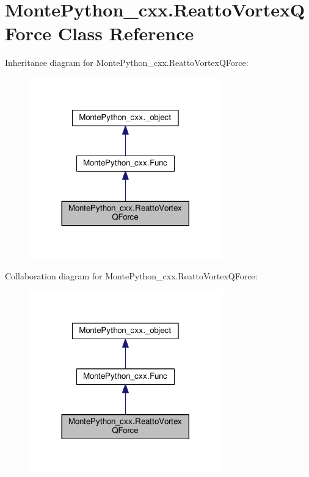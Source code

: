 \hypertarget{classMontePython__cxx_1_1ReattoVortexQForce}{}\section{Monte\+Python\+\_\+cxx.\+Reatto\+Vortex\+Q\+Force Class Reference}
\label{classMontePython__cxx_1_1ReattoVortexQForce}


Inheritance diagram for Monte\+Python\+\_\+cxx.\+Reatto\+Vortex\+Q\+Force\+:
\nopagebreak
\begin{figure}[H]
\begin{center}
\leavevmode
\includegraphics[width=236pt]{classMontePython__cxx_1_1ReattoVortexQForce__inherit__graph}
\end{center}
\end{figure}


Collaboration diagram for Monte\+Python\+\_\+cxx.\+Reatto\+Vortex\+Q\+Force\+:
\nopagebreak
\begin{figure}[H]
\begin{center}
\leavevmode
\includegraphics[width=236pt]{classMontePython__cxx_1_1ReattoVortexQForce__coll__graph}
\end{center}
\end{figure}
